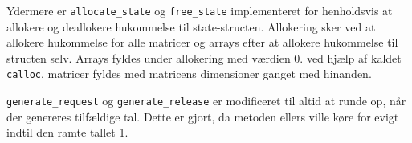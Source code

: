 Ydermere er \texttt{allocate\_state} og \texttt{free\_state} implementeret for henholdsvis at allokere og deallokere hukommelse til state-structen. Allokering sker ved at allokere hukommelse for alle matricer og arrays efter at allokere hukommelse til structen selv. Arrays fyldes under allokering med værdien 0. ved hjælp af kaldet \texttt{calloc}, matricer fyldes med matricens dimensioner ganget med hinanden.

\texttt{generate\_request} og \texttt{generate\_release} er modificeret til altid at runde op, når der genereres tilfældige tal. Dette er gjort, da metoden ellers ville køre for evigt indtil den ramte tallet 1.
